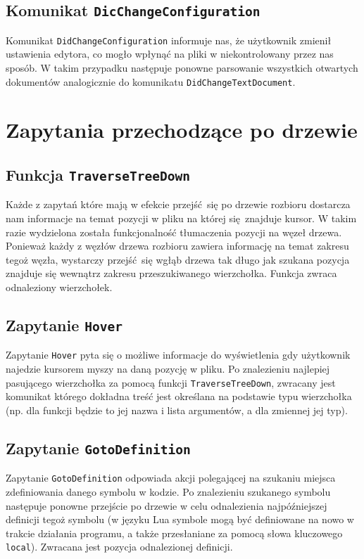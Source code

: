 \subsection{Komunikat \texttt{DicChangeConfiguration}}
Komunikat \texttt{DidChangeConfiguration} informuje nas, że użytkownik zmienił ustawienia edytora, co mogło wpłynąć na pliki w niekontrolowany przez nas sposób. W takim przypadku następuje ponowne parsowanie wszystkich otwartych dokumentów analogicznie do komunikatu \texttt{DidChangeTextDocument}.

\section{Zapytania przechodzące po drzewie}
\subsection{Funkcja \texttt{TraverseTreeDown}}
Każde z zapytań które mają w efekcie przejść się po drzewie rozbioru dostarcza nam informacje na temat pozycji w pliku na której się znajduje kursor. W takim razie wydzielona została funkcjonalność tłumaczenia pozycji na węzeł drzewa. Ponieważ każdy z węzłów drzewa rozbioru zawiera informację na temat zakresu tegoż węzła, wystarczy przejść się wgłąb drzewa tak długo jak szukana pozycja znajduje się wewnątrz zakresu przeszukiwanego wierzchołka. Funkcja zwraca odnaleziony wierzchołek.

\subsection{Zapytanie \texttt{Hover}}
Zapytanie \texttt{Hover} pyta się o możliwe informacje do wyświetlenia gdy użytkownik najedzie kursorem myszy na daną pozycję w pliku. Po znalezieniu najlepiej pasującego wierzchołka za pomocą funkcji \texttt{TraverseTreeDown}, zwracany jest komunikat którego dokładna treść jest określana na podstawie typu wierzchołka (np. dla funkcji będzie to jej nazwa i lista argumentów, a dla zmiennej jej typ).

\subsection{Zapytanie \texttt{GotoDefinition}}
Zapytanie \texttt{GotoDefinition} odpowiada akcji polegającej na szukaniu miejsca zdefiniowania danego symbolu w kodzie. Po znalezieniu szukanego symbolu następuje ponowne przejście po drzewie w celu odnalezienia najpóźniejszej definicji tegoż symbolu (w języku Lua symbole mogą być definiowane na nowo w trakcie działania programu, a także przesłaniane za pomocą słowa kluczowego \texttt{local}). Zwracana jest pozycja odnalezionej definicji.

